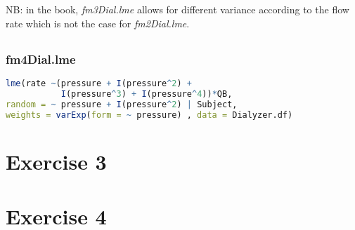 \documentclass[a4paper,12pt]{article}
\begin{document}
	NB: in the book, \textit{fm3Dial.lme} allows for different variance according to the flow rate which is not the case for \textit{fm2Dial.lme}.
	
	\subsection{}
	\subsubsection*{fm4Dial.lme}
	\begin{lstlisting}[language=R]
lme(rate ~(pressure + I(pressure^2) +
           I(pressure^3) + I(pressure^4))*QB,
random = ~ pressure + I(pressure^2) | Subject,
weights = varExp(form = ~ pressure) , data = Dialyzer.df)
	\end{lstlisting}

	\section{Exercise 3}
	
	
	\section{Exercise 4}

	
	
	
\end{document}
